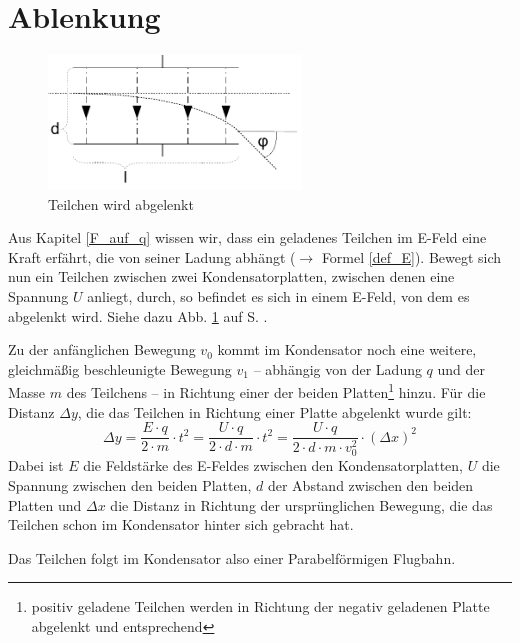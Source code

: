 		\section{Ablenkung}
		\begin{figure}
		\centering
		\includegraphics[width=0.6\textwidth]{mat/ablenkung}
		\caption{Teilchen wird abgelenkt}
		\label{img_ablenkung}
		\end{figure}
Aus Kapitel \ref{F_auf_q} wissen wir, dass ein geladenes Teilchen im E-Feld eine Kraft erfährt, die von seiner Ladung abhängt (\(\rightarrow\) Formel \ref{def_E}). Bewegt sich nun ein Teilchen zwischen zwei Kondensatorplatten, zwischen denen eine Spannung \(U\) anliegt, durch, so befindet es sich in einem E-Feld, von dem es abgelenkt wird. Siehe dazu Abb. \ref{img_ablenkung} auf S. \pageref{img_ablenkung}.

Zu der anfänglichen Bewegung \(v_0\) kommt im Kondensator noch eine weitere, gleichmäßig beschleunigte Bewegung \(v_1\) -- abhängig von der Ladung \(q\) und der Masse \(m\) des Teilchens -- in Richtung einer der beiden Platten\footnote{positiv geladene Teilchen werden in Richtung der negativ geladenen Platte abgelenkt und entsprechend} hinzu. Für die Distanz \(\Delta y\), die das Teilchen in Richtung einer Platte abgelenkt wurde gilt:
	\begin{equation}
	\Delta y = \frac{E \cdot q}{2 \cdot m} \cdot t^2 = \frac{U \cdot q}{2 \cdot d \cdot m} \cdot t^2 = \frac{U \cdot q}{2\cdot d \cdot m \cdot v_0^2} \cdot ( \Delta x)^2
	\label{ablenkung_kondensator}
	\end{equation}
Dabei ist \(E\) die Feldstärke des E-Feldes zwischen den Kondensatorplatten, \(U\) die Spannung zwischen den beiden Platten, \(d\) der Abstand zwischen den beiden Platten und \(\Delta x\) die Distanz in Richtung der ursprünglichen Bewegung, die das Teilchen schon im Kondensator hinter sich gebracht hat. 

Das Teilchen folgt im Kondensator also einer Parabelförmigen Flugbahn.


